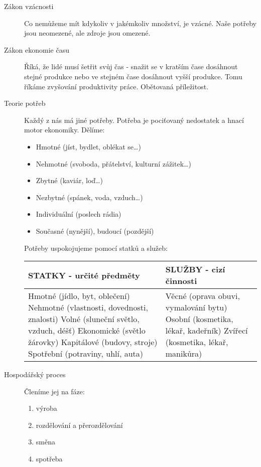 \documentclass[11pt,a4paper,twoside]{book}
\begin{document}
\begin{description}
\begin{enumerate}
	\end{enumerate}
	\item[Zákon vzácnosti] Co nemůžeme mít kdykoliv v jakémkoliv množství, je vzácné. Naše potřeby jsou neomezené, ale zdroje jsou omezené.
	\item[Zákon ekonomie času] Říká, že lidé musí šetřit svůj čas - snažit se v kratším čase dosáhnout stejné produkce nebo ve stejném
čase dosáhnout vyšší produkce. Tomu říkáme zvyšování produktivity práce. Obětovaná příležitost.
	\item[Teorie potřeb] Každý z nás má jiné potřeby. Potřeba je pociťovaný nedostatek a hnací motor ekonomiky. Dělíme:
	\begin{itemize}
		\item Hmotné (jíst, bydlet, oblékat se\ldots)
		\item Nehmotné (svoboda, přátelství, kulturní zážitek\ldots)
		\item Zbytné (kaviár, loď\ldots)
		\item Nezbytné (spánek, voda, vzduch\ldots)
		\item Individuální (poslech rádia)
		\item Současné (nynější), budoucí (pozdější)
	\end{itemize}
	Potřeby uspokojujeme pomocí statků a služeb:

\begin{tabular}{| p{8cm} | p{8cm} |}
	\hline
		\textbf{STATKY - určité předměty} & \textbf{SLUŽBY - cizí činnosti} \\
	\hline
	 Hmotné (jídlo, byt, oblečení) \newline Nehmotné (vlastnosti, dovednosti, znalosti) \newline Volné (sluneční světlo, vzduch, déšť) \newline Ekonomické (světlo žárovky) \newline Kapitálové (budovy, stroje) \newline Spotřební (potraviny, uhlí, auta) & Věcné (oprava obuvi, vymalování bytu) \newline Osobní (kosmetika, lékař, kadeřník) \newline Zvířecí (kosmetika, lékař, manikůra) \\
	\hline
\end{tabular}
	\item[Hospodářský proces] Členíme jej na fáze:
	\begin{enumerate}
		\item výroba
		\item rozdělování a přerozdělování
		\item směna
		\item spotřeba
	\end{enumerate}


\end{description}
\end{document}
